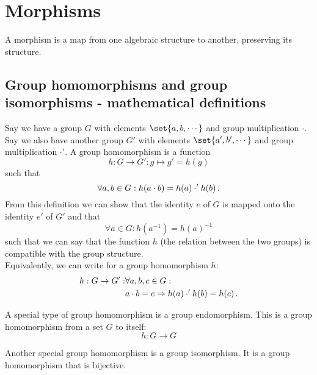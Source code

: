 \section{Morphisms}
    A morphism is a map from one algebraic structure to another, preserving its structure.

    \subsection{Group homomorphisms and group isomorphisms - mathematical definitions}
        Say we have a group $G$ with elements $\set{a, b, \cdots}$ and group multiplication $\cdot$. Say we also have another group $G'$ with elements $\set{a', b', \cdots}$ and group multiplication $\cdot'$. A group homomorphism is a function
        \begin{equation}
           h: G \rightarrow G': g \mapsto g' = h(g)
        \end{equation}
        such that
        \begin{equation}
           \forall a, b \in G: h(a \cdot b) = h(a) \cdot' h(b) \thinspace .
        \end{equation}
        From this definition we can show that the identity $e$ of $G$ is mapped onto the identity $e'$ of $G'$ and that
        \begin{equation}
           \forall a \in G: h(a^{-1}) = h(a)^{-1}
        \end{equation}
        such that we can say that the function $h$ (the relation between the two groups) is compatible with the group structure. \\

        Equivalently, we can write for a group homomorphism $h$:
        \begin{align}
            h: G \rightarrow G': &\forall a, b, c \in G: \\
            &a \cdot b = c \Rightarrow h(a) \cdot' h(b) = h(c) \thinspace .
        \end{align}

        A special type of group homomorphism is a group endomorphism. This is a group homomorphism from a set $G$ to itself:
        \begin{equation}
            h: G \rightarrow G
        \end{equation}

        Another special group homomorphism is a group isomorphism. It is a group homomorphism that is bijective. \\

